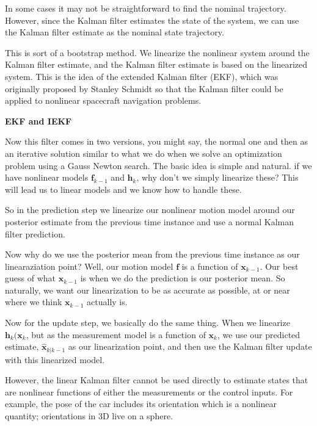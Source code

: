 In some cases it may not be straightforward to find 
the nominal trajectory.  However, since the Kalman  filter estimates the state of 
the system, we can use the Kalman filter estimate as the nominal state trajectory.

This is sort of a bootstrap method.  We linearize the nonlinear system around the 
Kalman filter estimate, and the Kalman filter estimate is based on the linearized 
system. This is the idea of the extended Kalman filter (EKF), which was originally 
proposed by Stanley Schmidt so that the Kalman filter could be applied to nonlinear 
spacecraft navigation problems.

\begin{framed}
\theoremstyle{remark}
\begin{remark}{\textbf{EKF and IEKF}}

Now this filter comes in two versions, you might say,
the normal one and then as an iterative solution
similar to what we do when we solve an optimization problem using a Gauss Newton search.
The basic idea is simple and natural. if we have nonlinear models $\mathbf{f}_{k-1}$ and $\mathbf{h}_k$,
why don't we simply linearize these? This will lead us to linear models and we know how to handle these.
\end{remark}
\end{framed}

So in the prediction step we linearize our nonlinear motion
model around our posterior estimate
from the previous time instance and use a normal Kalman filter prediction.

Now why do we use the posterior mean
from the previous time instance as our linearaziation point?
Well, our motion model $\mathbf{f}$ is a function of $\mathbf{x}_{k-1}$. Our best guess of what $\mathbf{x}_{k-1}$
is when we do the prediction is our posterior mean.
So naturally, we want our linearization to be as accurate as possible, at or near where we
think $\mathbf{x}_{k-1}$ actually is.

Now for the update step, we basically do the same thing.
When we linearize $\mathbf{h}_{k}(\mathbf{x}_k$, but as the measurement model
is a function of $\mathbf{x}_k$, we use our predicted estimate, $\hat{\mathbf{x}}_{k|k-1}$ as our linearization point,
and then use the Kalman filter update with this linearized model.

However, the linear Kalman filter cannot be used directly
to estimate states that are nonlinear functions of either
the measurements or the control inputs. For example, the pose of the car includes its orientation which is
a nonlinear quantity; orientations in 3D live on a sphere. 


